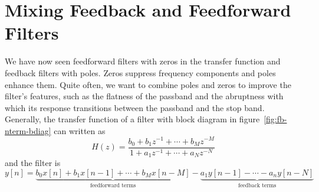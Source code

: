 \section{Mixing Feedback and Feedforward Filters}

We have now seen feedforward filters with zeros in the transfer
function and feedback filters with poles. Zeros suppress frequency
components and poles enhance them.  Quite often, we want to combine
poles and zeros to improve the filter's features, such as the flatness
of the passband and the abruptness with which its response transitions
between the passband and the stop band.  Generally, the transfer
function of a filter with block diagram in
figure~\ref{fig:fb-nterm-bdiag} can written as
\begin{equation}
H(z)=\frac{b_0+b_1z^{-1}+\cdots+b_Mz^{-M}}{1+a_1z^{-1}+\cdots+a_Nz^{-N}}
\label{eq:gen-xfer}
\end{equation}
and the filter is  
\begin{equation}
y[n] = \underbrace{b_0x[n] + b_1x[n-1] + \cdots +
      b_Mx[n-M]}_{\text{feedforward terms}}
      - 
      \underbrace{a_1y[n-1] - \cdots - a_ny[n-N]}_{\text{feedback terms}}
\label{eq:gen-impl}
\end{equation}


